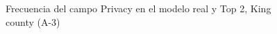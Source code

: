 \begin{figure}[H]
    \centering
    
    \caption{Frecuencia del campo Privacy en el modelo real y Top 2, King county (A-3)}
    \label{frecuency-top2-privacy}
\end{figure}